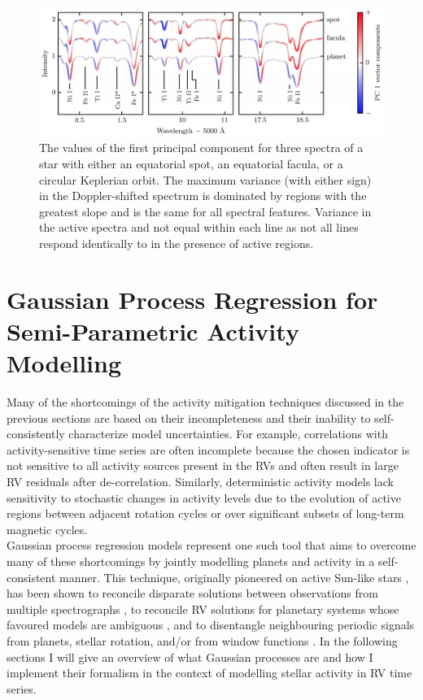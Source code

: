 \begin{figure}
  \centering
  \includegraphics[width=\hsize]{figures/pca.png}
  \caption[Principal component analysis of idealized spectra containing either spots, faculae, or planets.]
          {The values of the first principal component for three spectra of a star with either an equatorial
            spot, an equatorial facula, or a circular Keplerian orbit. The maximum variance (with either sign)
            in the Doppler-shifted spectrum is dominated by regions with the greatest slope and is the same
            for all spectral features. Variance in the active spectra and not equal within each line as not all
            lines respond identically to in the presence of active regions. \citep[Image credit:][]{davis17}}
  \label{fig:pca}
\end{figure}


\section{Gaussian Process Regression for Semi-Parametric Activity Modelling} \label{sect:gp}
Many of the shortcomings of the activity mitigation techniques discussed in the
previous sections are based on their incompleteness and their inability to
self-consistently characterize model uncertainties. For example, correlations with
activity-sensitive time series are often incomplete because the chosen indicator
is not sensitive to all activity sources present in the RVs and often result in
large RV residuals after de-correlation. Similarly, deterministic activity models
lack sensitivity to stochastic changes in activity levels due to the evolution
of active regions between adjacent rotation cycles or over
significant subsets of long-term magnetic cycles. \\

Gaussian process regression models represent one such tool that aims to overcome
many of these shortcomings by jointly modelling planets and activity in a self-consistent
manner. This technique, originally pioneered on active Sun-like stars
\citep[e.g.][]{haywood14,grunblatt15,faria16,lopezmorales16},
has been shown to reconcile disparate solutions
between observations from multiple spectrographs \citep{rajpaul17,cloutier19a},
to reconcile RV solutions for planetary systems whose favoured models are
ambiguous \citep{rajpaul17,cloutier19a}, and to disentangle neighbouring periodic
signals from planets, stellar rotation, and/or from window functions
\citep{rajpaul16,cloutier17b}.
In the following sections I will give an overview
of what Gaussian processes are and how I implement their formalism in the context
of modelling stellar activity in RV time series. \\


